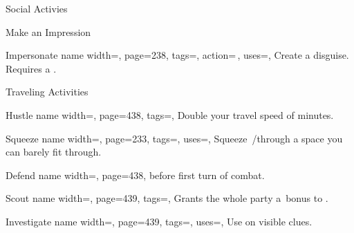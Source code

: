 \begin{PageFront}
\begin{Tables}{\frontTableHeight}
\begin{Table}{Social Activies}
\begin{entry}{Make an Impression}
            \end{entry}
            \begin{entry}{Impersonate}{%
                name width=\activityLength,%
                page=238,
                tags=\Concentrate\Manipulate,
                action=\,,
                uses={\Deception[tags={S}]},
            }
                Create a disguise. Requires a . \hfill {} 
            \end{entry}
        \end{Table}
        \TableSpace
        \begin{Table}{Traveling Activities}
            \begin{entry}{Hustle}{%
                name width=\activityLength,%
                page=438,
                tags=\Move,
            }
                Double your travel speed of  minutes.\quad {}
            \end{entry}
            \begin{entry}{Squeeze}{%
                name width=\activityLength,%
                page=233,
                tags=\Move,
                uses={\Acrobatics[tags=T]},
            }
                Squeeze \,\Feet/\Min through a space you can barely fit through. \hfill {}
            \end{entry}
            \begin{entry}{Defend}{%
                name width=\activityLength,%
                page=438,
            }
                 before first turn of combat.\hfill
            \end{entry}
            \begin{entry}{Scout}{%
                name width=\activityLength,%
                page=439,
                tags=\Concentrate,
            }
                Grants the whole party a \,\Cirm bonus to .
            \end{entry}
            \breakLine
            \begin{entry}{Investigate}{%
                name width=\activityLength,%
                page=439,
                tags=\Concentrate,
                uses={\VariousKnowledge[tags=S]},
            }
                Use  on visible clues.\hfill {}\quad{}

\end{entry}
\end{Table}
\end{Tables}
\end{PageFront}
